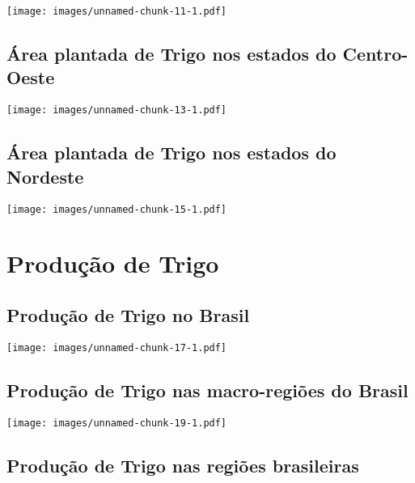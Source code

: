 \documentclass[
]{article}
\begin{document}
\texttt{[image: images/unnamed-chunk-11-1.pdf]}

\hypertarget{uxe1rea-plantada-de-trigo-nos-estados-do-centro-oeste}{%
\subsection{Área plantada de Trigo nos estados do
Centro-Oeste}\label{uxe1rea-plantada-de-trigo-nos-estados-do-centro-oeste}}

\texttt{[image: images/unnamed-chunk-13-1.pdf]}

\hypertarget{uxe1rea-plantada-de-trigo-nos-estados-do-nordeste}{%
\subsection{Área plantada de Trigo nos estados do
Nordeste}\label{uxe1rea-plantada-de-trigo-nos-estados-do-nordeste}}

\texttt{[image: images/unnamed-chunk-15-1.pdf]}

\hypertarget{produuxe7uxe3o-de-trigo}{%
\section{Produção de Trigo}\label{produuxe7uxe3o-de-trigo}}

\hypertarget{produuxe7uxe3o-de-trigo-no-brasil}{%
\subsection{Produção de Trigo no
Brasil}\label{produuxe7uxe3o-de-trigo-no-brasil}}

\texttt{[image: images/unnamed-chunk-17-1.pdf]}

\hypertarget{produuxe7uxe3o-de-trigo-nas-macro-regiuxf5es-do-brasil}{%
\subsection{Produção de Trigo nas macro-regiões do
Brasil}\label{produuxe7uxe3o-de-trigo-nas-macro-regiuxf5es-do-brasil}}

\texttt{[image: images/unnamed-chunk-19-1.pdf]}

\hypertarget{produuxe7uxe3o-de-trigo-nas-regiuxf5es-brasileiras}{%
\subsection{Produção de Trigo nas regiões
brasileiras}\label{produuxe7uxe3o-de-trigo-nas-regiuxf5es-brasileiras}}
\end{document}
